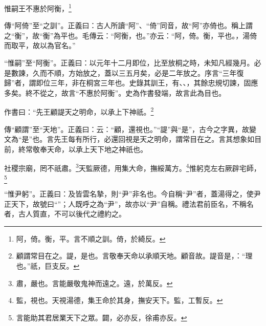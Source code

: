 惟嗣王不惠於阿衡，\footnote{阿，倚。衡，平。言不順之訓。倚，於綺反。}


{\noindent\zhuan{}\fzbyks 傳“阿倚”至“之訓”。正義曰：古人所讀“阿”、“倚”同音，故“阿”亦倚也。稱上謂之“衡”，故“衡”為平也。毛傳云：“阿衡，也。”亦云：“阿，倚。衡，平也。，湯倚而取平，故以為官名。” \par}

{\noindent\shu{}\fzkt “惟嗣”至“阿衡”。正義曰：以元年十二月即位，比至放桐之時，未知凡經幾月。必是數諫，久而不順，方始放之，蓋以三五月矣，必是二年放之。序言“三年復歸”者，謂即位三年，非在桐宮三年也。史錄其訓王，有、、，其餘忠規切諫，固應多矣。終不從之，故言“不惠於阿衡”。史為作書發端，故言此為目也。 \par}

作書曰：“先王顧諟天之明命，以承上下神祇。\footnote{顧謂常目在之。諟，是也。言敬奉天命以承順天地。顧音故。諟音是，：“理也。”祇，巨支反。}

{\noindent\zhuan{}\fzbyks 傳“顧謂”至“天地”。正義曰：云：“顧，還視也。”“諟”與“是”，古今之字異，故變文為“是”也。言先王每有所行，必還回視是天之明命，謂常目在之。言其想象如目前，終常敬奉天命，以承上天下地之神祇也。 \par}

社稷宗廟，罔不祇肅。\footnote{肅，嚴也。言能嚴敬鬼神而遠之。遠，於萬反。}天監厥德，用集大命，撫綏萬方。\footnote{監，視也。天視湯德，集王命於其身，撫安天下。監，工暫反。}惟躬克左右厥辟宅師，\footnote{言能助其君居業天下之眾。闢，必亦反，徐甫亦反。}

{\noindent\shu{}\fzkt “惟尹躬”。正義曰：及皆雲名摯，則“尹”非名也。今自稱“尹”者，蓋湯得之，使尹正天下，故號曰“”；人既呼之為“尹”，故亦以“尹”自稱。禮法君前臣名，不稱名者，古人質直，不可以後代之禮約之。 \par}

